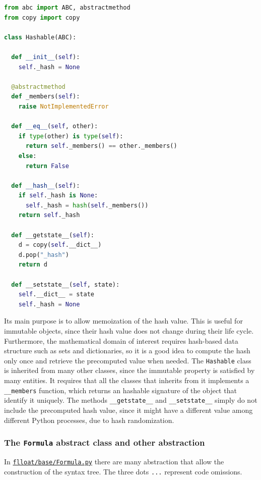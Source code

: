 \begin{lstlisting}[language=Python, style=Python, escapechar = £, label={code:Hashable}, caption={The \texttt{Hashable} class.}]
from abc import ABC, abstractmethod
from copy import copy

class Hashable(ABC):

  def __init__(self):
    self._hash = None

  @abstractmethod
  def _members(self):
    raise NotImplementedError

  def __eq__(self, other):
    if type(other) is type(self):
      return self._members() == other._members()
    else:
      return False

  def __hash__(self):
    if self._hash is None:
      self._hash = hash(self._members())
    return self._hash

  def __getstate__(self):
    d = copy(self.__dict__)
    d.pop("_hash")
    return d

  def __setstate__(self, state):
    self.__dict__ = state
    self._hash = None
\end{lstlisting}

Its main purpose is to allow memoization of the hash value. This is useful for immutable objects, since their hash value does not change during their life cycle. Furthermore, the mathematical domain of interest requires hash-based data structure such as sets and dictionaries, so it is a good idea to compute the hash only once and retrieve the precomputed value when needed. The \texttt{Hashable} class is inherited from many other classes, since the immutable property is satisfied by many entities. It requires that all the classes that inherits from it implements a \texttt{\_\_members} function, which returns an hashable signature of the object that identify it uniquely. The methods \texttt{\_\_getstate\_\_} and \texttt{\_\_setstate\_\_} simply do not include the precomputed hash value, since it might have a different value among different Python processes, due to hash randomization.


\subsubsection{The \texttt{Formula} abstract class and other abstraction}
In \href{https://github.com/MarcoFavorito/flloat/blob/0.1.4/flloat/base/Formula.py}{\texttt{flloat/base/Formula.py}} there are many abstraction that allow the construction of the syntax tree. The three dots \texttt{...} represent code omissions. 

